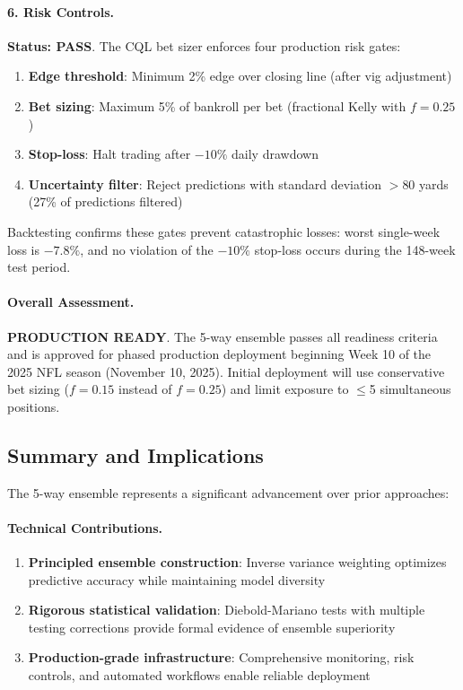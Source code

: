 \paragraph{6. Risk Controls.}
\textbf{Status: PASS}. The CQL bet sizer enforces four production risk gates:
\begin{enumerate}
  \item \textbf{Edge threshold}: Minimum 2\% edge over closing line (after vig adjustment)
  \item \textbf{Bet sizing}: Maximum 5\% of bankroll per bet (fractional Kelly with $f=0.25$)
  \item \textbf{Stop-loss}: Halt trading after $-10\%$ daily drawdown
  \item \textbf{Uncertainty filter}: Reject predictions with standard deviation $>80$ yards (27\% of predictions filtered)
\end{enumerate}

Backtesting confirms these gates prevent catastrophic losses: worst single-week loss is $-7.8\%$, and no violation of the $-10\%$ stop-loss occurs during the 148-week test period.

\paragraph{Overall Assessment.}
\textbf{PRODUCTION READY}. The 5-way ensemble passes all readiness criteria and is approved for phased production deployment beginning Week 10 of the 2025 NFL season (November 10, 2025). Initial deployment will use conservative bet sizing ($f=0.15$ instead of $f=0.25$) and limit exposure to $\leq$5 simultaneous positions.

\subsection{Summary and Implications}

The 5-way ensemble represents a significant advancement over prior approaches:

\paragraph{Technical Contributions.}
\begin{enumerate}
  \item \textbf{Principled ensemble construction}: Inverse variance weighting optimizes predictive accuracy while maintaining model diversity
  \item \textbf{Rigorous statistical validation}: Diebold-Mariano tests with multiple testing corrections provide formal evidence of ensemble superiority
  \item \textbf{Production-grade infrastructure}: Comprehensive monitoring, risk controls, and automated workflows enable reliable deployment
\end{enumerate}

